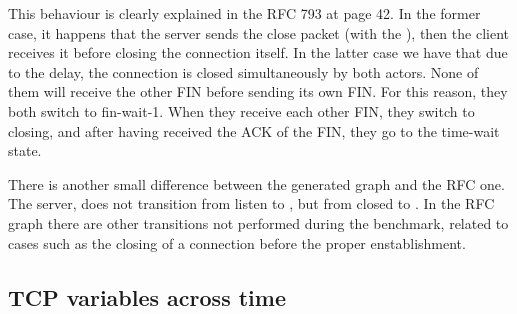 \documentclass[a4paper,10pt]{article}
\begin{document}
This behaviour is clearly explained in the RFC 793\cite{postel_transmission_nodate} at page 42. In the former case, it happens that the server sends the close packet (with the ), then the client receives it before closing the connection itself.
In the latter case we have that due to the delay, the connection is closed simultaneously by both actors. None of them will receive the other FIN before sending its own FIN. For this reason, they both switch to fin-wait-1. When they receive each other FIN, they switch to closing, and after having received the ACK of the FIN, they go to the time-wait state.

There is another small difference between the generated graph and the RFC one. The server, does not transition from listen to , but from closed to . In the RFC graph there are other transitions not performed during the benchmark, related to cases such as the closing of a connection before the proper enstablishment.



\subsection{TCP variables across time}
\label{sec:tcp_variables}
\end{document}
